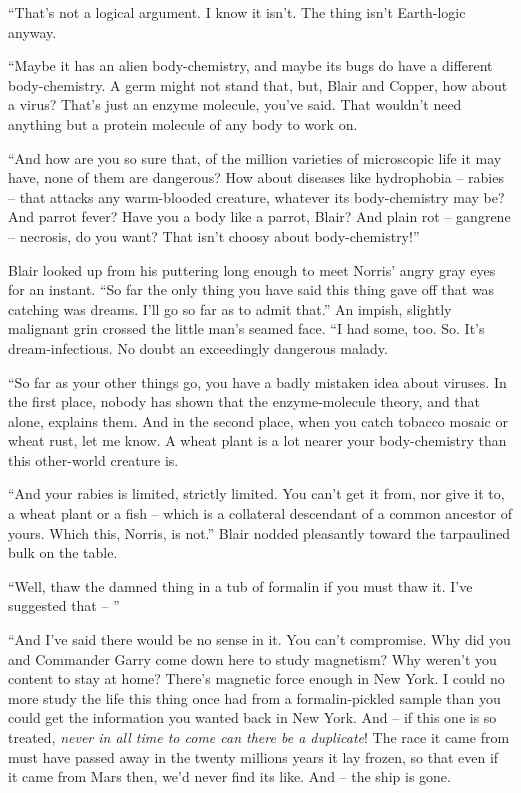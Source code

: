 \documentclass[letterpaper,openany,12pt]{memoir}		%
\begin{document}
``That's not a logical argument. I know it isn't. The thing isn't Earth-logic
anyway.

``Maybe it has an alien body-chemistry, and maybe its bugs do have a different
body-chemistry. A germ might not stand that, but, Blair and Copper, how about a
virus? That's just an enzyme molecule, you've said. That wouldn't need anything
but a protein molecule of any body to work on.

``And how are you so sure that, of the million varieties of microscopic life it
may have, none of them are dangerous? How about diseases like hydrophobia --
rabies -- that attacks any warm-blooded creature, whatever its body-chemistry
may be? And parrot fever? Have you a body like a parrot, Blair? And plain rot --
gangrene -- necrosis, do you want? That isn't choosy about body-chemistry!''

Blair looked up from his puttering long enough to meet Norris' angry gray eyes
for an instant. ``So far the only thing you have said this thing gave off that
was catching was dreams. I'll go so far as to admit that.'' An impish, slightly
malignant grin crossed the little man's seamed face. ``I had some, too. So. It's
dream-infectious. No doubt an exceedingly dangerous malady.

``So far as your other things go, you have a badly mistaken idea about viruses.
In the first place, nobody has shown that the enzyme-molecule theory, and that
alone, explains them. And in the second place, when you catch tobacco mosaic or
wheat rust, let me know. A wheat plant is a lot nearer your body-chemistry than
this other-world creature is.

``And your rabies is limited, strictly limited. You can't get it from, nor give
it to, a wheat plant or a fish -- which is a collateral descendant of a common
ancestor of yours. Which this, Norris, is not.'' Blair nodded pleasantly toward
the tarpaulined bulk on the table.

``Well, thaw the damned thing in a tub of formalin if you must thaw it. I've
suggested that -- ''

``And I've said there would be no sense in it. You can't compromise. Why did you
and Commander Garry come down here to study magnetism? Why weren't you content
to stay at home? There's magnetic force enough in New York. I could no more
study the life this thing once had from a formalin-pickled sample than you could
get the information you wanted back in New York. And -- if this one is so
treated, \emph{never in all time to come can there be a duplicate}! The race it
came from must have passed away in the twenty millions years it lay frozen, so
that even if it came from Mars then, we'd never find its like. And -- the ship
is gone.
\end{document}

